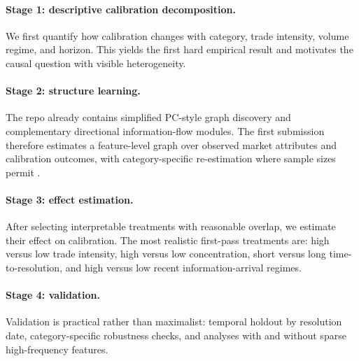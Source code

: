 \documentclass[10pt]{article}
\begin{document}
\paragraph{Stage 1: descriptive calibration decomposition.}
We first quantify how calibration changes with category, trade intensity, volume
regime, and horizon. This yields the first hard empirical result and motivates
the causal question with visible heterogeneity.

\paragraph{Stage 2: structure learning.}
The repo already contains simplified PC-style graph discovery and complementary
directional information-flow modules. The first submission therefore estimates a
feature-level graph over observed market attributes and calibration outcomes,
with category-specific re-estimation where sample sizes permit
\citep{spirtes2000causation,pearl2009causality}.

\paragraph{Stage 3: effect estimation.}
After selecting interpretable treatments with reasonable overlap, we estimate
their effect on calibration. The most realistic first-pass treatments are:
high versus low trade intensity, high versus low concentration, short versus
long time-to-resolution, and high versus low recent information-arrival
regimes.

\paragraph{Stage 4: validation.}
Validation is practical rather than maximalist: temporal holdout by resolution
date, category-specific robustness checks, and analyses with and without sparse
high-frequency features.
\end{document}

